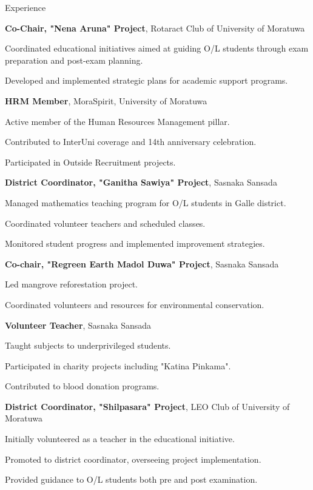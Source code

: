 \begin{rubric}{Experience}

\entry*[2023 -- Present]%
    \textbf{Co-Chair, "Nena Aruna" Project}, Rotaract Club of University of Moratuwa
    \par Coordinated educational initiatives aimed at guiding O/L students through exam preparation and post-exam planning.
    \par Developed and implemented strategic plans for academic support programs.

\entry*[2023 -- Present]%
    \textbf{HRM Member}, MoraSpirit, University of Moratuwa
    \par Active member of the Human Resources Management pillar.
    \par Contributed to InterUni coverage and 14th anniversary celebration.
    \par Participated in Outside Recruitment projects.

\entry*[2023]%
    \textbf{District Coordinator, "Ganitha Sawiya" Project}, Sasnaka Sansada
    \par Managed mathematics teaching program for O/L students in Galle district.
    \par Coordinated volunteer teachers and scheduled classes.
    \par Monitored student progress and implemented improvement strategies.

\entry*[2022 -- 2023]%
    \textbf{Co-chair, "Regreen Earth Madol Duwa" Project}, Sasnaka Sansada
    \par Led mangrove reforestation project.
    \par Coordinated volunteers and resources for environmental conservation.

\entry*[2022 -- 2023]%
    \textbf{Volunteer Teacher}, Sasnaka Sansada
    \par Taught subjects to underprivileged students.
    \par Participated in charity projects including "Katina Pinkama".
    \par Contributed to blood donation programs.

\entry*[2023 -- Present]%
    \textbf{District Coordinator, "Shilpasara" Project}, LEO Club of University of Moratuwa
    \par Initially volunteered as a teacher in the educational initiative.
    \par Promoted to district coordinator, overseeing project implementation.
    \par Provided guidance to O/L students both pre and post examination.

\end{rubric}
